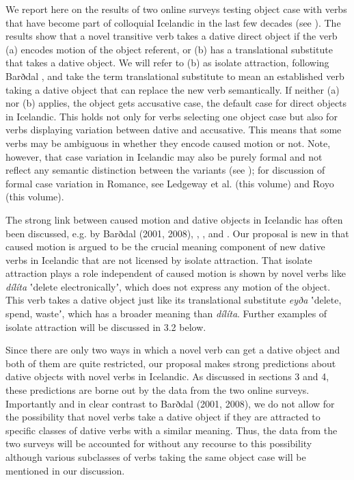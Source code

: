 \documentclass[output=paper,modfonts,nonflat]{langsci/langscibook}
\begin{document}
We report here on the results of two online surveys testing object case with verbs that have become part of colloquial Icelandic in the last few decades (see \citealt{Thórarinsdóttir2015}). The results show that a novel transitive verb takes a dative direct object if the verb (a) encodes motion of the object referent, or (b) has a translational substitute that takes a dative object. We will refer to (b) as isolate attraction, following Barðdal , and take the term translational substitute to mean an established verb taking a dative object that can replace the new verb semantically. If neither (a) nor (b) applies, the object gets accusative case, the default case for direct objects in Icelandic. This holds not only for verbs selecting one object case but also for verbs displaying variation between dative and accusative. This means that some verbs may be ambiguous in whether they encode caused motion or not. Note, however, that case variation in Icelandic may also be purely formal and not reflect any semantic distinction between the variants (see \citealt{Jónsson2013b}); for discussion of formal case variation in Romance, see Ledgeway et al. (this volume) and Royo (this volume).

The strong link between caused motion and dative objects in Icelandic has often been discussed, e.g. by Barðdal (2001, 2008), \citet{Svenonius2002}, \citet{Maling2002}, and \citet{Jónsson2013a}. Our proposal is new in that caused motion is argued to be the crucial meaning component of new dative verbs in Icelandic that are not licensed by isolate attraction. That isolate attraction plays a role independent of caused motion is shown by novel verbs like \textit{dílíta} ʽdelete electronicallyʼ, which does not express any motion of the object. This verb takes a dative object just like its translational substitute \textit{eyða} ʽdelete, spend, wasteʼ, which has a broader meaning than \textit{dílíta}. Further examples of isolate attraction will be discussed in 3.2 below.

Since there are only two ways in which a novel verb can get a dative object and both of them are quite restricted, our proposal makes strong predictions about dative objects with novel verbs in Icelandic. As discussed in sections 3 and 4, these predictions are borne out by the data from the two online surveys. Importantly and in clear contrast to Barðdal (2001, 2008), we do not allow for the possibility that novel verbs take a dative object if they are attracted to specific classes of dative verbs with a similar meaning. Thus, the data from the two surveys will be accounted for without any recourse to this possibility although various subclasses of verbs taking the same object case will be mentioned in our discussion.
\end{document}
